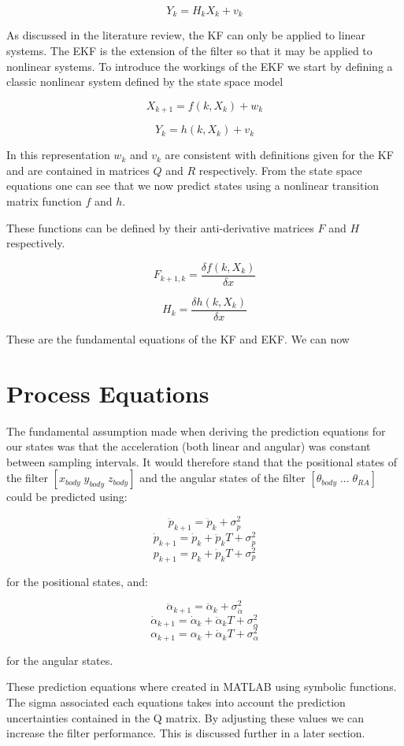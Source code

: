 $$ Y_k = H_{k}X_{k} + v_{k} $$


As discussed in the literature review, the KF can only be applied to linear systems. The EKF is the extension of the filter so that it may be applied to nonlinear systems. To introduce the workings of the EKF we start by defining a classic nonlinear system defined by the state space model

$$ X_{k+1} = f(k,X_{k}) + w_{k}  $$

$$ Y_k = h(k,X_{k}) + v_{k} $$

In this representation $ w_{k} $ and $ v_{k} $ are consistent with definitions given for the KF and are contained in matrices $ Q $ and $ R $ respectively. From the state space equations one can see that we now predict states using a nonlinear transition matrix function $ f $ and $ h $.

These functions can be defined by their anti-derivative matrices $F$ and $H$ respectively.

$$ F_{k+1,k} = \frac{\delta f(k,X_{k})}{\delta x} $$

$$ H_{k} = \frac{\delta h(k,X_{k})}{\delta x} $$

These are the fundamental equations of the KF and EKF. We can now 

\section{Process Equations}
The fundamental assumption made when deriving the prediction equations for our states was that the acceleration (both linear and angular) was constant between sampling intervals. It would therefore stand that the positional states of the filter $[x_{body} \; y_{body} \; z_{body}]$ and the angular states of the filter $[\theta_{body} \; ... \; \theta_{RA}]$ could be predicted using: 

$$ \ddot{p}_{k+1} = \ddot{p}_{k} + \sigma_{\ddot{p}}^{2} $$
$$ \dot{p}_{k+1} = \dot{p}_{k} + \ddot{p}_{k}T + \sigma_{\dot{p}}^{2} $$
$$ p_{k+1} = p_{k} + \dot{p}_{k}T + \sigma_{p}^{2} $$

for the positional states, and:

$$ \ddot{\alpha}_{k+1} = \ddot{\alpha}_{k} + \sigma_{\ddot{\alpha}}^{2} $$
$$ \dot{\alpha}_{k+1} = \dot{\alpha}_{k} + \ddot{\alpha}_{k}T + \sigma_{\dot{\alpha}}^{2} $$
$$ \alpha_{k+1} = \alpha_{k} + \dot{\alpha}_{k}T + \sigma_{\alpha}^{2} $$

for the angular states.

These prediction equations where created in MATLAB using symbolic functions. The sigma associated each equations takes into account the prediction uncertainties contained in the Q matrix. By adjusting these values we can increase the filter performance. This is discussed further in a later section.

